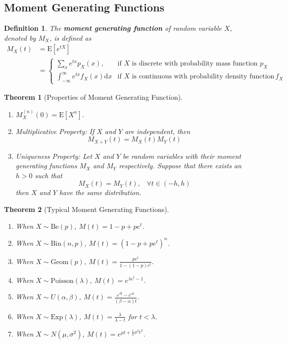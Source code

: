 \documentclass[12pt]{article}
\newcommand{\diff}{\mathrm{d}}
\newcommand{\be}{\mathrm{Be}}
\newcommand{\expec}{\mathrm{E}}
\newcommand{\bin}{\mathrm{Bin}}
\newcommand{\geom}{\mathrm{Geom}}
\newcommand{\Poi}{\mathrm{Poisson}}
\newcommand{\expo}{\mathrm{Exp}}
\newtheorem{definition}{Definition}[section]
\newtheorem{theorem}{Theorem}[section]
\theoremstyle{definition}
\begin{document}
\subsection{Moment Generating Functions}
\begin{definition}\normalfont The \textbf{moment generating function} of random variable $X$, denoted by $M_X$, is defined as
\[
\begin{aligned}
M_X(t)&=\expec[e^{tX}]\\
&=\begin{cases}
\sum_x e^{tx}p_X(x),&\text{if }X\text{ is discrete with probability mass function }p_X\\
\int_{-\infty}^\infty e^{tx}f_X(x)\diff x&\text{if }X\text{ is continuous with probability density function }f_X
\end{cases}
\end{aligned}
\]
\end{definition}
\begin{theorem}[Properties of Moment Generating Function]\hfill\\\normalfont
\begin{enumerate}
\item $M_X^{(n)}(0)=\expec[X^n]$.
\item Multiplicative Property: If $X$ and $Y$ are independent, then
\[
M_{X+Y}(t)=M_X(t)M_Y(t)
\]
\item Uniqueness Property: Let $X$ and $Y$ be random variables with their moment generating functions $M_X$ and $M_Y$ respectively. Suppose that there exists an $h>0$ such that 
\[
M_X(t)=M_Y(t),\;\;\;\forall t\in(-h,h)
\]
then $X$ and $Y$ have the same distribution.
\end{enumerate}
\end{theorem}
\begin{theorem}[Typical Moment Generating Functions]\hfill\\\normalfont
\begin{enumerate}
\item When $X\sim\be(p)$, $M(t)=1-p+pe^t$.
\item When $X\sim\bin(n,p)$, $M(t)=(1-p+pe^t)^n$.
\item When $X\sim\geom(p)$, $M(t)=\frac{pe^t}{1-(1-p)e^t}$.
\item When $X\sim\Poi(\lambda)$, $M(t)=e^{\lambda e^t-1}$.
\item When $X\sim U(\alpha, \beta)$, $M(t)=\frac{e^{\beta t}-e^{\alpha t}}{(\beta-\alpha)t}$.
\item When $X\sim\expo(\lambda)$, $M(t)=\frac{\lambda}{\lambda-t}$ for $t<\lambda$.
\item When $X\sim N(\mu,\sigma^2)$, $M(t)=e^{\mu t+\frac{1}{2}\sigma^2 t^2}$.
\end{enumerate}
\end{theorem}
\end{document}
